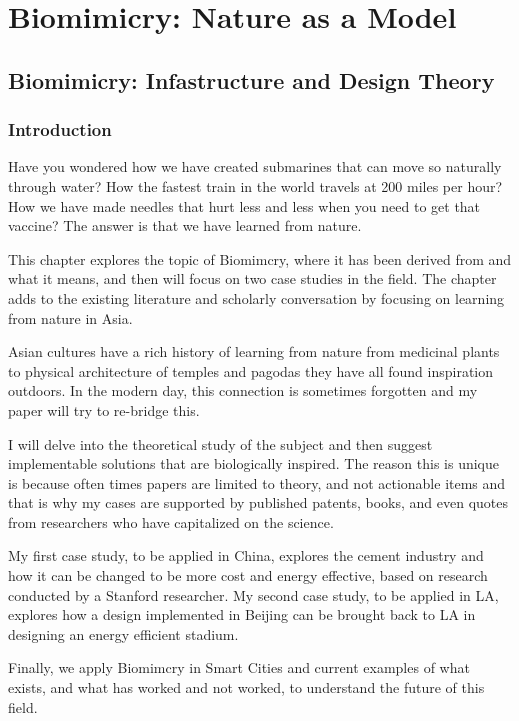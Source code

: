 \chapter{Biomimicry: Nature as a Model}\label{ch:biomimicry}


\section{Biomimicry: Infastructure and Design Theory}

\subsection{Introduction}
Have you wondered how we have created submarines that can move so naturally through water? How the fastest train in the world travels at 200 miles per hour? How we have made needles that hurt less and less when you need to get that vaccine? The answer is that we have learned from nature.

This chapter explores the topic of Biomimcry, where it has been derived from and what it means, and then will focus on two case studies in the field. The chapter adds to the existing literature and scholarly conversation by focusing on learning from nature in Asia. 

Asian cultures have a rich history of learning from nature from medicinal plants to physical architecture of temples and pagodas they have all found inspiration outdoors. In the modern day, this connection is sometimes forgotten and my paper will try to re-bridge this. 

I will delve into the theoretical study of the subject and then suggest implementable solutions that are biologically inspired. The reason this is unique is because often times papers are limited to theory, and not actionable items and that is why my cases are supported by published patents, books, and even quotes from researchers who have capitalized on the science. 

My first case study, to be applied in China, explores the cement industry and how it can be changed to be more cost and energy effective, based on research conducted by a Stanford researcher. My second case study, to be applied in LA, explores how a design implemented in Beijing can be brought back to LA in designing an energy efficient stadium. 

Finally, we apply Biomimcry in Smart Cities and current examples of what exists, and what has worked and not worked, to understand the future of this field.

